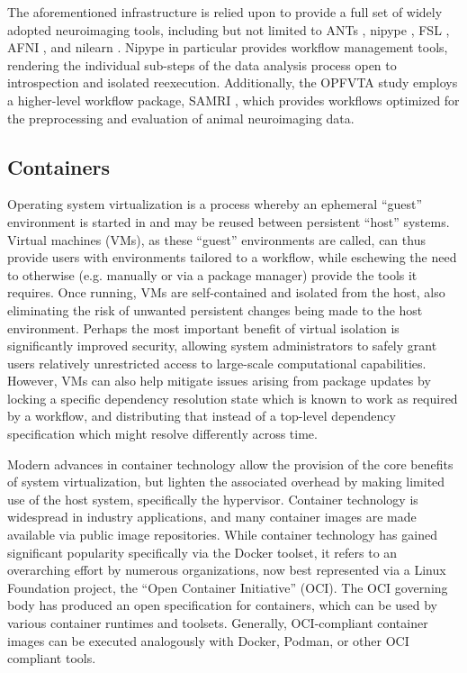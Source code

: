 The aforementioned infrastructure is relied upon to provide a full set of widely adopted neuroimaging tools, including but not limited to ANTs \cite{ants}, nipype \cite{nipype}, FSL \cite{fsl}, AFNI \cite{afni}, and nilearn \cite{nilearn}.
Nipype in particular provides workflow management tools, rendering the individual sub-steps of the data analysis process open to introspection and isolated reexecution.
Additionally, the OPFVTA study employs a higher-level workflow package, SAMRI \cite{samri,irsabi}, which provides workflows optimized for the preprocessing and evaluation of animal neuroimaging data.


\subsection{Containers}

Operating system virtualization is a process whereby an ephemeral “guest” environment is started in and may be reused between persistent “host” systems.
Virtual machines (VMs), as these “guest” environments are called, can thus provide users with environments tailored to a workflow, while eschewing the need to otherwise (e.g. manually or via a package manager) provide the tools it requires.
Once running, VMs are self-contained and isolated from the host, also eliminating the risk of unwanted persistent changes being made to the host environment.
Perhaps the most important benefit of virtual isolation is significantly improved security, allowing system administrators to safely grant users relatively unrestricted access to large-scale computational capabilities.
However, VMs can also help mitigate issues arising from package updates by locking a specific dependency resolution state which is known to work as required by a workflow, and distributing that instead of a top-level dependency specification which might resolve differently across time.

Modern advances in container technology allow the provision of the core benefits of system virtualization, but lighten the associated overhead by making limited use of the host system, specifically the hypervisor.
Container technology is widespread in industry applications, and many container images are made available via public image repositories.
While container technology has gained significant popularity specifically via the Docker toolset, it refers to an overarching effort by numerous organizations, now best represented via a Linux Foundation project, the “Open Container Initiative” (OCI).
The OCI governing body has produced an open specification for containers, which can be used by various container runtimes and toolsets.
Generally, OCI-compliant container images can be executed analogously with Docker, Podman, or other OCI compliant tools.


